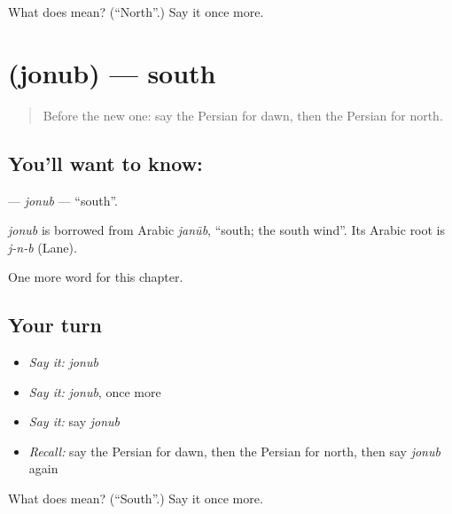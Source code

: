 \begin{tcolorbox}[breakable,colback=teal!4,colframe=teal!35!black,title={Before you move on}]
What does  mean? (\textquotedblleft{}North\textquotedblright{}.) Say it once more.
\end{tcolorbox}
\section[\texorpdfstring{\fa{جنوب} (jonub)}{جنوب (jonub)}]{ (jonub) — south}

\label{lesson:FA-C230-jonub}



\begin{quote}
Before the new one: say the Persian for dawn, then the Persian for north.
\end{quote}

\subsection*{You'll want to know: }
\textbf{} — \emph{jonub} — \textquotedblleft{}south\textquotedblright{}.

\begin{cousinweb}
\emph{jonub} is borrowed from Arabic \emph{janūb}, \textquotedblleft{}south; the south wind\textquotedblright{}. Its Arabic root is \emph{j-n-b} (Lane).
\end{cousinweb}

\begin{grammarlens}[title={What you've built}]
One more word for this chapter.
\end{grammarlens}

\subsection*{Your turn}
\begin{itemize}
\raggedright
  \item \emph{Say it:} \emph{jonub}
  \item \emph{Say it:} \emph{jonub}, once more
  \item \emph{Say it:} say \emph{jonub}
  \item \emph{Recall:} say the Persian for dawn, then the Persian for north, then say \emph{jonub} again
\end{itemize}

\begin{tcolorbox}[breakable,colback=teal!4,colframe=teal!35!black,title={Before you move on}]
What does  mean? (\textquotedblleft{}South\textquotedblright{}.) Say it once more.
\end{tcolorbox}
